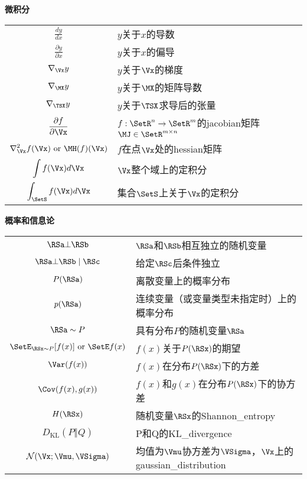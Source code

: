 \vspace{\notationgap}
\begin{minipage}{\textwidth}
\centerline{\bf 微积分}
\bgroup
\def\arraystretch{1.5}
\begin{tabular}{cp{3.25in}}
$\displaystyle\frac{d y} {d x}$ &  $y$关于$x$的导数 \\
$\displaystyle \frac{\partial y} {\partial x} $ &  $y$关于$x$的偏导 \\
$\displaystyle \nabla_{\Vx} y $ & $y$关于$\Vx$的梯度 \\
$\displaystyle \nabla_{\MX} y $ & $y$关于$\MX$的矩阵导数 \\
$\displaystyle \nabla_{\TSX} y $ &  $y$关于$\TSX$求导后的张量 \\
$\displaystyle \frac{\partial f}{\partial \Vx} $ &$f: \SetR^n \rightarrow \SetR^m$的\gls{jacobian}矩阵$\MJ \in \SetR^{m\times n}$   \\
$\displaystyle \nabla_{\Vx}^2 f(\Vx)\text{ or }\MH( f)(\Vx)$ &  $f$在点$\Vx$处的\gls{hessian}矩阵 \\
$\displaystyle \int f(\Vx) d\Vx $ & $\Vx$整个域上的定积分 \\
$\displaystyle \int_\SetS f(\Vx) d\Vx$ & 集合$\SetS$上关于$\Vx$的定积分 \\
\end{tabular}
\egroup
\end{minipage}

\vspace{\notationgap}
\begin{minipage}{\textwidth}
\centerline{\bf 概率和信息论}
\bgroup
\def\arraystretch{1.5}
\begin{tabular}{cp{3.25in}}
$\displaystyle \RSa \bot \RSb$ &  $\RSa$和$\RSb$相互独立的随机变量 \\
$\displaystyle \RSa \bot \RSb \mid \RSc $ &  给定$\RSc$后条件独立 \\
$\displaystyle P(\RSa)$ & 离散变量上的概率分布 \\
$\displaystyle p(\RSa)$ & 连续变量（或变量类型未指定时）上的概率分布  \\
$\displaystyle \RSa \sim P$ &  具有分布$P$的随机变量$\RSa$\\
$\displaystyle  \SetE_{\RSx\sim P} [ f(x) ]\text{ or } \SetE f(x)$ & $f(x)$关于$P(\RSx)$的期望 \\
$\displaystyle \Var(f(x)) $ &  $f(x)$在分布$P(\RSx)$下的方差 \\
$\displaystyle \Cov(f(x),g(x)) $ &  $f(x)$和$g(x)$在分布$P(\RSx)$下的协方差 \\
$\displaystyle H(\RSx) $ & 随机变量$\RSx$的\gls{Shannon_entropy} \\
$\displaystyle D_{\text{KL}} ( P \Vert Q ) $ & P和Q的\gls{KL_divergence} \\
$\displaystyle \mathcal{N} ( \Vx ; \Vmu , \VSigma)$ & 均值为$\Vmu$协方差为$\VSigma$，$\Vx$上的\gls{gaussian_distribution} \\
\end{tabular}
\egroup
\end{minipage}

